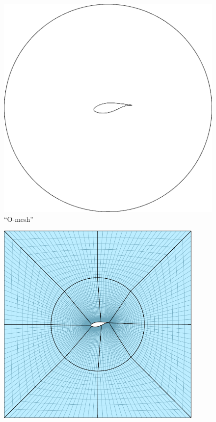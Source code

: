 \documentclass[landscape]{sintefposter}
\begin{document}
\begin{multicols}{3}
\begin{figure}[ht]
  \begin{center}
    \begin{minipage}[b]{0.28\linewidth}
      \begin{center}
        \includegraphics[width=.9\textwidth]{Figures/tfi-1}
        \small{``O-mesh''}
      \end{center}
    \end{minipage}
    \begin{minipage}[b]{0.28\linewidth}
      \begin{center}
        \includegraphics[width=0.9\textwidth]{Figures/tfi-4}

\end{center}
\end{minipage}
\end{center}
\end{figure}
\end{multicols}
\end{document}
